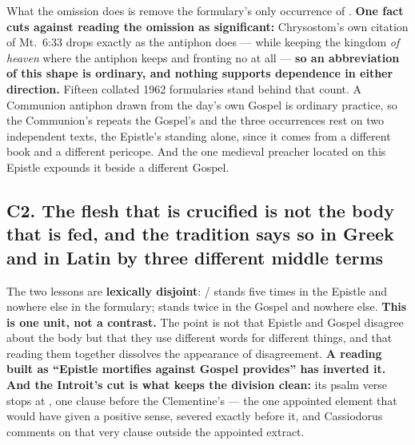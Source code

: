 What the omission does is remove the formulary's only occurrence of
. \textbf{One fact cuts against reading the omission as
significant:} Chrysostom's own
citation of Mt.\ 6:33 drops  exactly as the antiphon
does --- while keeping the kingdom \emph{of heaven} where the antiphon keeps
 and fronting no  at all --- \textbf{so an
abbreviation of this shape is ordinary, and nothing supports dependence in
either direction.} Fifteen collated 1962 formularies stand behind that count. A
Communion antiphon drawn from the day's own Gospel is ordinary practice, so the
Communion's  repeats the Gospel's and the three occurrences
rest on two independent texts, the Epistle's standing alone, since it comes
from a different book and a different pericope. And the one medieval preacher located on this Epistle
expounds it beside a different Gospel.

\subsection*{C2. The flesh that is crucified is not the body that is fed, and the tradition says so in Greek and in Latin by three different middle terms}

The two lessons are \textbf{lexically disjoint}: /
stands five times in the Epistle and nowhere else in the formulary;
 stands twice in the Gospel and nowhere else. \textbf{This is one
unit, not a contrast.} The point is not that Epistle and Gospel disagree about
the body but that they use different words for different things, and that
reading them together dissolves the appearance of disagreement. \textbf{A
reading built as ``Epistle mortifies against Gospel provides'' has inverted
it.} \textbf{And the Introit's cut is what keeps the division clean:} its psalm
verse stops at , one clause before the Clementine's
 --- the one appointed
element that would have given  a positive sense, severed exactly
before it, and Cassiodorus comments on that very clause outside the appointed
extract.

